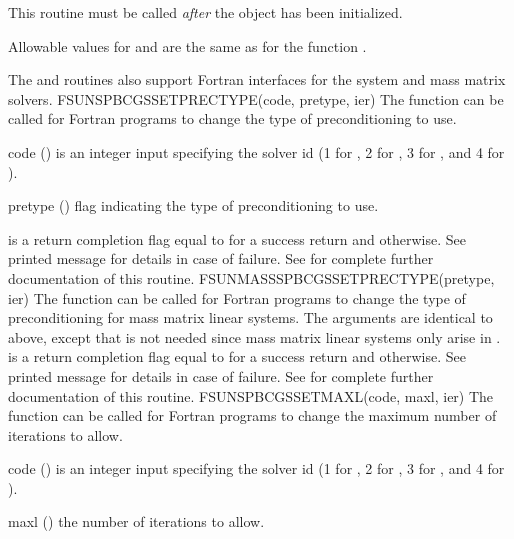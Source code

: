 {
  This routine must be called \emph{after} the {\nvector} object has
  been initialized.

  Allowable values for  and  are the same as for
  the {\CC} function \newline {}.
}
%
%
The  and
 routines also support Fortran interfaces
for the system and mass matrix solvers.
%
%
{
  FSUNSPBCGSSETPRECTYPE(code, pretype, ier)
}
{
  The function  can be called for Fortran
  programs to change the type of preconditioning to use.
}
{
  \begin{args}[pretype]
  \item[code] ()
    is an integer input specifying the solver id (1 for {\cvode}, 2
    for {\ida}, 3 for {\kinsol}, and 4 for {\arkode}).
  \item[pretype] ()
    flag indicating the type of preconditioning to use.
  \end{args}
}
{
   is a  return completion flag equal to  for a success
  return and  otherwise. See printed message for details in case
  of failure.
}
{
  See  for complete further documentation of
  this routine.
}
%
%
{
  FSUNMASSSPBCGSSETPRECTYPE(pretype, ier)
}
{
  The function  can be called for Fortran
  programs to change the type of preconditioning for mass matrix
  linear systems.
}
{
  The arguments are identical to  above, except that
   is not needed since mass matrix linear systems only arise
  in {\arkode}.
}
{
   is a  return completion flag equal to  for a success
  return and  otherwise. See printed message for details in case
  of failure.
}
{
  See  for complete further documentation of
  this routine.
}
%
%
{
  FSUNSPBCGSSETMAXL(code, maxl, ier)
}
{
  The function  can be called for Fortran
  programs to change the maximum number of iterations to allow.
}
{
  \begin{args}[maxl]
  \item[code] ()
    is an integer input specifying the solver id (1 for {\cvode}, 2
    for {\ida}, 3 for {\kinsol}, and 4 for {\arkode}).
  \item[maxl] ()
    the number of iterations to allow.
  \end{args}
}
